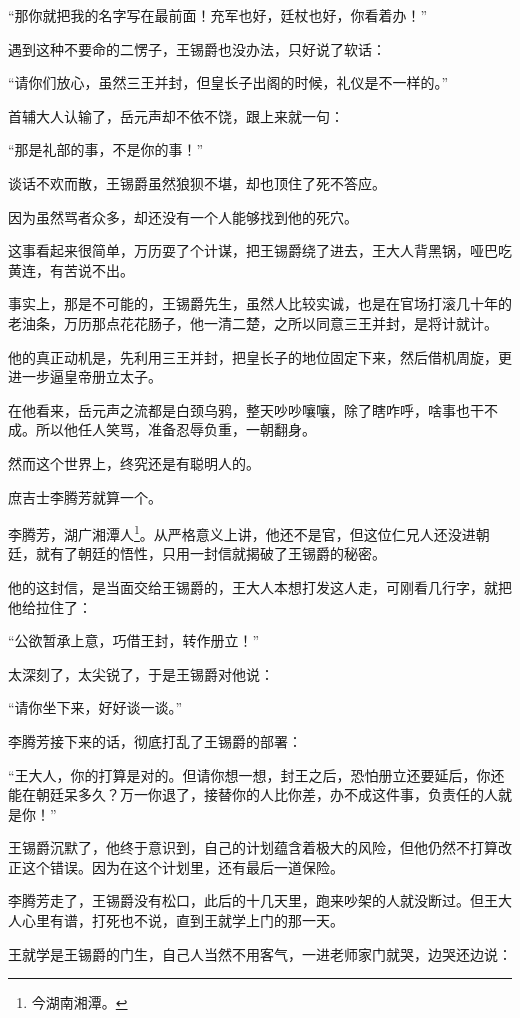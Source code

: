 \begin{multicols}{\theparacolNo}
		“那你就把我的名字写在最前面！充军也好，廷杖也好，你看着办！”

		遇到这种不要命的二愣子，王锡爵也没办法，只好说了软话：

		“请你们放心，虽然三王并封，但皇长子出阁的时候，礼仪是不一样的。”

		首辅大人认输了，岳元声却不依不饶，跟上来就一句：

		“那是礼部的事，不是你的事！”

		谈话不欢而散，王锡爵虽然狼狈不堪，却也顶住了死不答应。

		因为虽然骂者众多，却还没有一个人能够找到他的死穴。

		这事看起来很简单，万历耍了个计谋，把王锡爵绕了进去，王大人背黑锅，哑巴吃黄连，有苦说不出。

		事实上，那是不可能的，王锡爵先生，虽然人比较实诚，也是在官场打滚几十年的老油条，万历那点花花肠子，他一清二楚，之所以同意三王并封，是将计就计。

		他的真正动机是，先利用三王并封，把皇长子的地位固定下来，然后借机周旋，更进一步逼皇帝册立太子。

		在他看来，岳元声之流都是白颈乌鸦，整天吵吵嚷嚷，除了瞎咋呼，啥事也干不成。所以他任人笑骂，准备忍辱负重，一朝翻身。

		然而这个世界上，终究还是有聪明人的。

		庶吉士李腾芳就算一个。

		李腾芳，湖广湘潭人\footnote{今湖南湘潭。}。从严格意义上讲，他还不是官，但这位仁兄人还没进朝廷，就有了朝廷的悟性，只用一封信就揭破了王锡爵的秘密。

		他的这封信，是当面交给王锡爵的，王大人本想打发这人走，可刚看几行字，就把他给拉住了：

		“公欲暂承上意，巧借王封，转作册立！”

		太深刻了，太尖锐了，于是王锡爵对他说：

		“请你坐下来，好好谈一谈。”

		李腾芳接下来的话，彻底打乱了王锡爵的部署：

		“王大人，你的打算是对的。但请你想一想，封王之后，恐怕册立还要延后，你还能在朝廷呆多久？万一你退了，接替你的人比你差，办不成这件事，负责任的人就是你！”

		王锡爵沉默了，他终于意识到，自己的计划蕴含着极大的风险，但他仍然不打算改正这个错误。因为在这个计划里，还有最后一道保险。

		李腾芳走了，王锡爵没有松口，此后的十几天里，跑来吵架的人就没断过。但王大人心里有谱，打死也不说，直到王就学上门的那一天。

		王就学是王锡爵的门生，自己人当然不用客气，一进老师家门就哭，边哭还边说：


\end{multicols}
